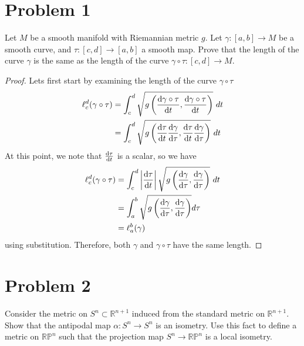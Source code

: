 \documentclass[a4paper]{article}
\begin{document}
\section*{Problem 1}%
Let $M$ be a smooth manifold with Riemannian metric $g$. Let $\gamma: [a,b] \rightarrow M$ be a smooth curve, and $\tau: [c,d] \rightarrow [a,b]$ a smooth map. Prove that the length of the curve $\gamma$ is the same as the length of the curve $\gamma \circ \tau: [c,d] \rightarrow M$.

\begin{proof}
Lets first start by examining the length of the curve $\gamma \circ \tau$ 
\[
  \begin{aligned}
    \ell_c^d(\gamma \circ \tau) &= \int_c^d \sqrt{g\left(\dv{\gamma \circ \tau}{t}, \dv{\gamma \circ \tau}{t}\right)}\ dt \\
             &= \int_c^d \sqrt{g\left(\dv{\tau}{t} \dv{\gamma}{\tau}, \dv{\tau}{t} \dv{\gamma}{\tau}\right)}\ dt
  \end{aligned}
\]
At this point, we note that $\dv{\tau}{t}$ is a scalar, so we have
\[
  \begin{aligned}
    \ell_c^d(\gamma \circ \tau) &= \int_c^d \left|  \dv{\tau}{t} \right|\sqrt{g\left(\dv{\gamma}{\tau}, \dv{\gamma}{\tau}\right)}\ dt \\
             &= \int_a^b \sqrt{g \left( \dv{\gamma}{\tau}, \dv{\gamma}{\tau} \right)} d\tau \\
             &= \ell_a^b(\gamma)
  \end{aligned}
\]
using substitution. Therefore, both $\gamma$ and $\gamma \circ \tau$ have the same length.
\end{proof}

\section*{Problem 2}%
Consider the metric on $S^n \subset \mathds{R}^{n+1}$ induced from the standard metric on $\mathds{R}^{n+1}$. Show that the antipodal map $\alpha: S^n \rightarrow S^n$ is an isometry. Use this fact to define a metric on $\mathds{RP}^n$ such that the projection map $S^n \rightarrow \mathds{RP}^n$ is a local isometry.
\end{document}
